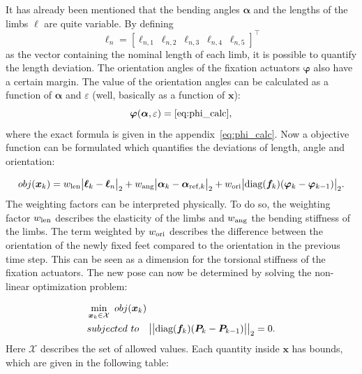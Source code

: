 \documentclass[10pt,a4paper]{article}
\begin{document}
It has already been mentioned that the bending angles $\bm{\alpha}$ and the lengths of the limbs $\bm{\ell}$ are quite variable. 
By defining 
\begin{equation}
\bm{\ell}_n = \left[ \ell_{n,1}~\ell_{n,2}~\ell_{n,3}~\ell_{n,4}~\ell_{n,5} \right]^\top
\end{equation}
as the vector containing the nominal length of each limb, it is possible to quantify the length deviation.
The orientation angles of the fixation actuators $\bm{\varphi}$ also have a certain margin.
The value of the orientation angles can be calculated as a function of $\bm{\alpha}$ and $\varepsilon$ (well, basically as a function of $\bm{x}$):
\begin{equation}
\bm{\varphi}(\bm{\alpha}, \varepsilon) = \eqref{eq:phi_calc},
\end{equation}
where the exact formula is given in the appendix~\ref{eq:phi_calc}.
Now a objective function can be formulated which quantifies the deviations of length, angle and orientation:

\begin{equation}
obj(\bm{x}_{k}) = %
  w_{\textnormal{len}}\big| \bm{\ell}_{k} - \bm{\ell}_n \big|_2
+ w_{\textnormal{ang}}\big| \bm{\alpha}_{k} - \bm{\alpha}_{\textnormal{ref},k} \big|_2
+ w_{\textnormal{ori}} \big| \textnormal{diag}(\bm{f}_k) ( \bm{\varphi}_{k} - \bm{\varphi}_{k-1}) \big|_2 .
\label{eq:objective_function}
\end{equation}
The weighting factors can be interpreted physically.
To do so, the weighting factor $w_{\textnormal{len}}$ describes the elasticity of the limbs and $w_{\textnormal{ang}}$ the bending stiffness of the limbs.
The term weighted by $w_{\textnormal{ori}}$ describes the difference between the orientation of the newly fixed feet compared to the orientation in the previous time step.
This can be seen as a dimension for the torsional stiffness of the fixation actuators.
The new pose can now be determined by solving the non-linear optimization problem:

\begin{equation}
\begin{split}
&\min_{\bm{x}_k \in \mathcal{X}} ~ obj(\bm{x}_k) \\
&subjected~to~~~
\big|\big|\textnormal{diag}(\bm{f}_k)(\bm{P}_{k} - \bm{P}_{k-1})\big|\big|_2 = 0.
\end{split}
\end{equation}
Here  $\mathcal{X}$ describes the set of allowed values.
Each quantity inside $\bm{x}$ has bounds, which are given in the following table:
\end{document}
